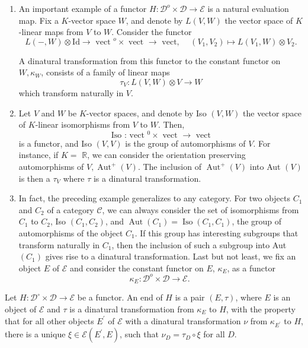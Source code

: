 \begin{enumerate}
    \item An important example of a functor $H: \mathcal{D}^o \times \mathcal{D} \rightarrow \mathcal{E}$ is a natural evaluation map. Fix a $K$-vector space $W$, and denote by $L(V, W)$ the vector space of $K$-linear maps from $V$ to $W$. Consider the functor
    $$
    L(-, W) \otimes \mathrm{Id} \rightarrow \text { vect }^o \times \text { vect } \rightarrow \text { vect, } \quad\left(V_1, V_2\right) \mapsto L\left(V_1, W\right) \otimes V_2 .
    $$
    
    A dinatural transformation from this functor to the constant functor on $W, \kappa_W$, consists of a family of linear maps
    $$
    \tau_V: L(V, W) \otimes V \rightarrow W
    $$
    which transform naturally in $V$.
    \item Let $V$ and $W$ be $K$-vector spaces, and denote by Iso $(V, W)$ the vector space of $K$-linear isomorphisms from $V$ to $W$. Then,
    $$
    \text { Iso : vect }{ }^0 \times \text { vect } \rightarrow \text { vect }
    $$
    is a functor, and Iso $(V, V)$ is the group of automorphisms of $V$. For instance, if $K=$ $\mathbb{R}$, we can consider the orientation preserving automorphisms of $V, \operatorname{Aut}^{+}(V)$. The inclusion of $\operatorname{Aut}^{+}(V)$ into Aut $(V)$ is then a $\tau_V$ where $\tau$ is a dinatural transformation. 
    \item In fact, the preceding example generalizes to any category. For two objects $C_1$ and $C_2$ of a category $\mathcal{C}$, we can always consider the set of isomorphisms from $C_1$ to $C_2$, Iso $\left(C_1, C_2\right)$, and $\operatorname{Aut}\left(C_1\right)=\operatorname{Iso}\left(C_1, C_1\right)$, the group of automorphisms of the object $C_1$. If this group has interesting subgroups that transform naturally in $C_1$, then the inclusion of such a subgroup into Aut $\left(C_1\right)$ gives rise to a dinatural transformation. Last but not least, we fix an object $E$ of $\mathcal{E}$ and consider the constant functor on $E$, $\kappa_E$, as a functor
    $$
    \kappa_E: \mathcal{D}^o \times \mathcal{D} \rightarrow \mathcal{E} \text {. }
    $$
\end{enumerate}

Let $H: \mathcal{D}^{\circ} \times \mathcal{D} \rightarrow \mathcal{E}$ be a functor. An end of $H$ is a pair $(E, \tau)$, where $E$ is an object of $\mathcal{E}$ and $\tau$ is a dinatural transformation from $\kappa_E$ to $H$, with the property that for all other objects $E^{\prime}$ of $\mathcal{E}$ with a dinatural transformation $\nu$ from $\kappa_{E^{\prime}}$ to $H$, there is a unique $\xi \in \mathcal{E}\left(E^{\prime}, E\right)$, such that $\nu_D=\tau_D \circ \xi$ for all $D$.

